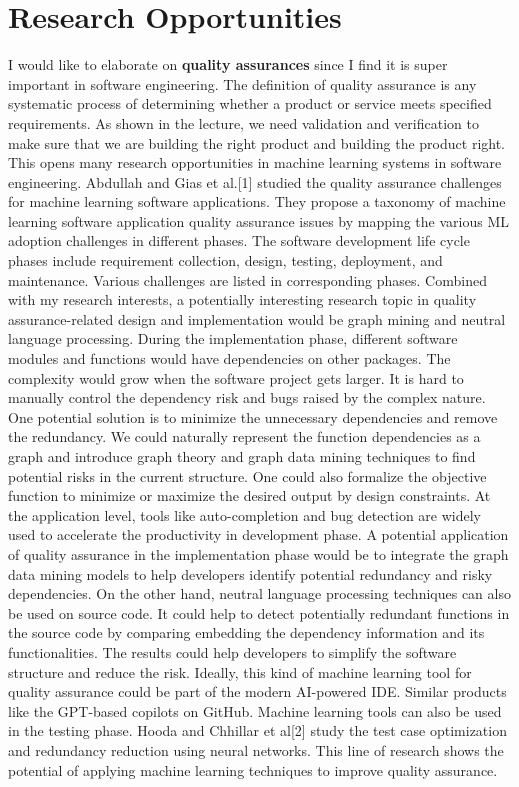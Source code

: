\documentclass[11pt]{article}
\begin{document}
\section{Research Opportunities}
 

I would like to elaborate on \textbf{quality assurances} since I find it is super important in software engineering. The definition of quality assurance is any systematic process of determining whether a product or service meets specified requirements. As shown in the lecture, we need validation and verification to make sure that we are building the right product and building the product right. This opens many research opportunities in machine learning systems in software engineering. Abdullah and Gias et al.[1] studied the quality assurance challenges for machine learning software applications. They propose a taxonomy of machine learning software application quality assurance issues by mapping the various ML adoption challenges in different phases. The software development life cycle phases include requirement collection, design, testing, deployment, and maintenance. Various challenges are listed in corresponding phases. Combined with my research interests, a potentially interesting research topic in quality assurance-related design and implementation would be graph mining and neutral language processing. During the implementation phase, different software modules and functions would have dependencies on other packages. The complexity would grow when the software project gets larger. It is hard to manually control the dependency risk and bugs raised by the complex nature. One potential solution is to minimize the unnecessary dependencies and remove the redundancy. We could naturally represent the function dependencies as a graph and introduce graph theory and graph data mining techniques to find potential risks in the current structure. One could also formalize the objective function to minimize or maximize the desired output by design constraints. At the application level, tools like auto-completion and bug detection are widely used to accelerate the productivity in development phase. A potential application of quality assurance in the implementation phase would be to integrate the graph data mining models to help developers identify potential redundancy and risky dependencies.  On the other hand, neutral language processing techniques can also be used on source code. It could help to detect potentially redundant functions in the source code by comparing embedding the dependency information and its functionalities. The results could help developers to simplify the software structure and reduce the risk. Ideally, this kind of machine learning tool for quality assurance could be part of the modern AI-powered IDE. Similar products like the GPT-based copilots on GitHub. Machine learning tools can also be used in the testing phase. Hooda and Chhillar et al[2] study the test case optimization and redundancy reduction using neural networks. This line of research shows the potential of applying machine learning techniques to improve quality assurance.
\end{document}
